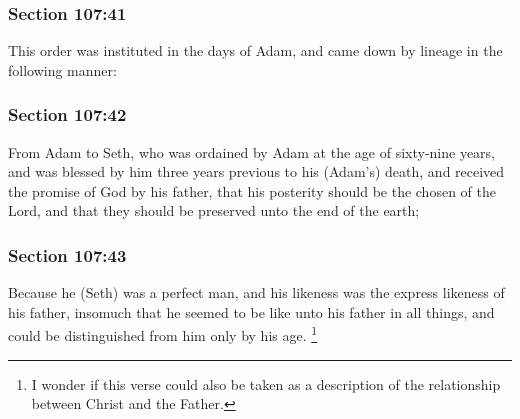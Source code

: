 	\subsubsection{Section 107:41} %
		\label{DC107-41}

		This order was instituted in the days of Adam, and came down by lineage in the following manner:


	\subsubsection{Section 107:42} %
		\label{DC107-42}

		From Adam to Seth, who was ordained by Adam at the age of sixty-nine years, and was blessed by him three years previous to his (Adam's) death, and received the promise of God by his father, that his posterity should be the chosen of the Lord, and that they should be preserved unto the end of the earth;


	\subsubsection{Section 107:43} %
		\label{DC107-43}

		Because he (Seth) was a perfect man, and his likeness was the express likeness of his father, insomuch that he seemed to be like unto his father in all things, and could be distinguished from him only by his age.%
			\footnote{%
				I wonder if this verse could also be taken as a description of the relationship between Christ and the Father.
				}

